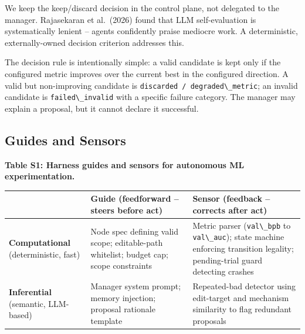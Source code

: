 We keep the keep/discard decision in the control plane, not delegated to the manager. Rajasekaran et al.~(2026) found that LLM self-evaluation is systematically lenient -- agents confidently praise mediocre work. A deterministic, externally-owned decision criterion addresses this.

The decision rule is intentionally simple: a valid candidate is kept only if the configured metric improves over the current best in the configured direction. A valid but non-improving candidate is \passthrough{\lstinline!discarded / degraded\_metric!}; an invalid candidate is \passthrough{\lstinline!failed\_invalid!} with a specific failure category. The manager may explain a proposal, but it cannot declare it successful.

\subsection{Guides and Sensors}\label{guides-and-sensors}

\textbf{Table S1: Harness guides and sensors for autonomous ML experimentation.}

\begin{table}[t]
\small
\begin{tabular}{@{}
  >{\raggedright\arraybackslash}p{}
  >{\raggedright\arraybackslash}p{}
  >{\raggedright\arraybackslash}p{}@{}}
\toprule
\begin{minipage}[b]{\linewidth}\raggedright
\end{minipage} & \begin{minipage}[b]{\linewidth}\raggedright
\textbf{Guide (feedforward -- steers before act)}
\end{minipage} & \begin{minipage}[b]{\linewidth}\raggedright
\textbf{Sensor (feedback -- corrects after act)}
\end{minipage} \\
\midrule
\bottomrule
\textbf{Computational} (deterministic, fast) & Node spec defining valid scope; editable-path whitelist; budget cap; scope constraints & Metric parser (\passthrough{\lstinline!val\_bpb!} to \passthrough{\lstinline!val\_auc!}); state machine enforcing transition legality; pending-trial guard detecting crashes \\
\textbf{Inferential} (semantic, LLM-based) & Manager system prompt; memory injection; proposal rationale template & Repeated-bad detector using edit-target and mechanism similarity to flag redundant proposals \\
\end{tabular}
\end{table}

